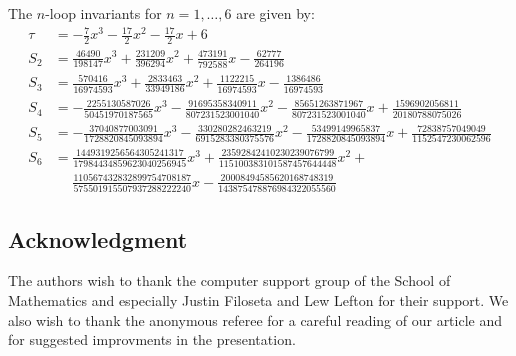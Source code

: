 \documentclass[12pt]{amsart}
\theoremstyle{definition}
\begin{document}
The $n$-loop invariants for $n=1,\dots,6$ are given by:
{\small
\begin{align*}
\tau &=-\frac{7}{2} x^{3} - \frac{17}{2} x^{2} - \frac{17}{2} x + 6
\\
S_2 &= \frac{46490}{198147} x^{3} + \frac{231209}{396294} x^{2} 
+ \frac{473191}{792588} x - \frac{62777}{264196}
\\
S_3 &= \frac{570416}{16974593} x^{3} + \frac{2833463}{33949186} x^{2} 
+ \frac{1122215}{16974593} x - \frac{1386486}{16974593}
\\
S_4 &= -\frac{2255130587026}{50451970187565} x^{3} 
- \frac{91695358340911}{807231523001040} x^{2} 
- \frac{85651263871967}{807231523001040} x 
+ \frac{1596902056811}{20180788075026}
\\
S_5 &= -\frac{37040877003091}{1728820845093894} x^{3} 
- \frac{330280282463219}{6915283380375576} x^{2} 
- \frac{53499149965837}{1728820845093894} x 
+ \frac{72838757049049}{1152547230062596}
\\
S_6 &= \frac{1449319256564305241317}{17984434859623040256945} x^3 +
\frac{23592842410230239076799}{115100383101587457644448} x^2 +
\\ & \quad\,\,
\frac{110567432832899754708187}{575501915507937288222240} x -
\frac{20008494585620168748319}{143875478876984322055560}
\end{align*}
}

\subsection*{Acknowledgment}
The authors wish to thank the computer support group of the School of 
Mathematics and especially Justin Filoseta and Lew Lefton for their support.
We also wish to thank the anonymous referee for a careful reading of our
article and for suggested improvments in the presentation.




\end{document}

